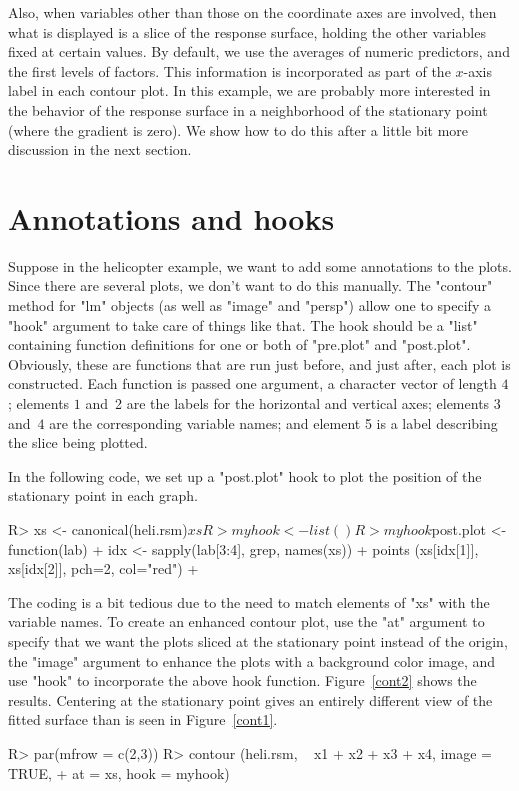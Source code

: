 \documentclass[article,nojss]{jss}
\begin{document}
Also, when variables other than those on the coordinate axes are involved, then what is displayed is a slice of the response surface, holding the other variables fixed at certain values.  By default, we use the averages of numeric predictors, and the first levels of factors.  This information is incorporated as part of the $x$-axis label in each contour plot.
\def\xbar{\bar{x}}
In this example, we are probably more interested in the behavior of the response surface in a neighborhood of the stationary point (where the gradient is zero).  We show how to do this after a little bit more discussion in the next section.


\section{Annotations and hooks}
Suppose in the helicopter example, we want to add some annotations to the plots.  Since there are several plots, we don't want to do this manually.  The "contour" method for "lm" objects (as well as "image" and "persp") allow one to specify a "hook" argument to take care of things like that.  The hook should be a "list" containing function definitions for one or both of "pre.plot" and "post.plot".  Obviously, these are functions that are run just before, and just after, each plot is constructed.  Each function is passed one argument, a character vector of length $4$; elements $1$ and~2 are the labels for the horizontal and vertical axes; elements $3$ and~$4$ are the corresponding variable names; and element 5 is a label describing the slice being plotted.

In the following code, we set up a "post.plot" hook to plot the position of the stationary point in each graph.
\begin{Schunk}
\begin{Sinput}
R> xs <- canonical(heli.rsm)$xs
R> myhook <- list()
R> myhook$post.plot <- function(lab) {
+   idx <- sapply(lab[3:4], grep, names(xs))
+   points (xs[idx[1]], xs[idx[2]], pch=2, col="red")
+ }
\end{Sinput}
\end{Schunk}
The coding is a bit tedious due to the need to match elements of "xs" with the variable names.  
To create an enhanced contour plot, use the "at" argument to specify that we want the plots sliced at the stationary point instead of the origin, the "image" argument to enhance the plots with a background color image, and use "hook" to incorporate the above hook function.  
Figure~\ref{cont2} shows the results.
Centering at the stationary point gives an entirely different view of the fitted surface than is seen in Figure~\ref{cont1}.
\begin{Schunk}
\begin{Sinput}
R> par(mfrow = c(2,3))
R> contour (heli.rsm, ~ x1 + x2 + x3 + x4, image = TRUE,
+   at = xs, hook = myhook)
\end{Sinput}
\end{Schunk}
\end{document}
